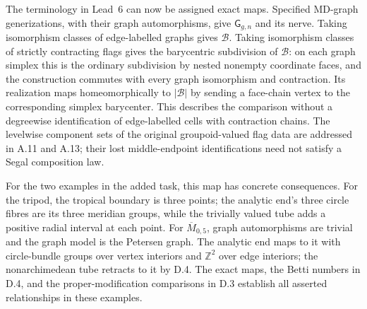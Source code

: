 The terminology in Lead~6 can now be assigned exact maps. Specified MD-graph generizations, with their graph automorphisms, give $\mathsf G_{g,n}$ and its nerve. Taking isomorphism classes of edge-labelled graphs gives $\mathcal B$. Taking isomorphism classes of strictly contracting flags gives the barycentric subdivision of $\mathcal B$: on each graph simplex this is the ordinary subdivision by nested nonempty coordinate faces, and the construction commutes with every graph isomorphism and contraction. Its realization maps homeomorphically to $|\mathcal B|$ by sending a face-chain vertex to the corresponding simplex barycenter. This describes the comparison without a degreewise identification of edge-labelled cells with contraction chains. The levelwise component sets of the original groupoid-valued flag data are addressed in A.11 and A.13; their lost middle-endpoint identifications need not satisfy a Segal composition law.

For the two examples in the added task, this map has concrete consequences. For the tripod, the tropical boundary is three points; the analytic end's three circle fibres are its three meridian groups, while the trivially valued tube adds a positive radial interval at each point. For $\overline M_{0,5}$, graph automorphisms are trivial and the graph model is the Petersen graph. The analytic end maps to it with circle-bundle groups over vertex interiors and $\mathbb Z^2$ over edge interiors; the nonarchimedean tube retracts to it by D.4. The exact maps, the Betti numbers in D.4, and the proper-modification comparisons in D.3 establish all asserted relationships in these examples.
